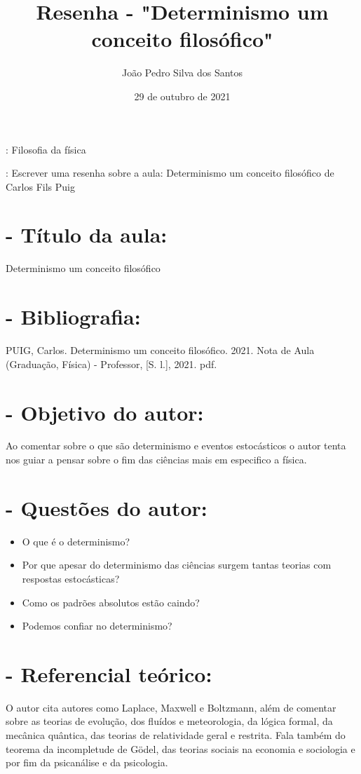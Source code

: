 \documentclass [a4paper, 12pt]{article}
\title{Resenha - "Determinismo um conceito filosófico"}
\author{João Pedro Silva dos Santos}
\date{29 de outubro de 2021}
\begin{document}
\maketitle

{}: Filosofia da física

{}: Escrever uma resenha sobre a aula: Determinismo um conceito filosófico de Carlos Fils Puig

\section*{- Título da aula:}

Determinismo um conceito filosófico

\section*{-  Bibliografia:}

PUIG, Carlos. Determinismo um conceito filosófico. 2021. Nota de Aula (Graduação, Física) - Professor, [S. l.], 2021. pdf.

\section*{- Objetivo do autor:}

Ao comentar sobre o que são determinismo e eventos estocásticos o autor tenta nos guiar a pensar sobre o fim das ciências mais em especifico a física.

\section*{- Questões do autor:}


\begin{itemize}
    \item O que é o determinismo?
    \item Por que apesar do determinismo das ciências surgem tantas teorias com respostas estocásticas?
    \item Como os padrões absolutos estão caindo?
    \item Podemos confiar no determinismo?
\end{itemize}

\section*{- Referencial teórico:}

O autor cita autores como Laplace, Maxwell e Boltzmann, além de comentar sobre as teorias de evolução, dos fluídos e meteorologia, da lógica formal, da mecânica quântica, das teorias de relatividade geral e restrita. Fala também do teorema da incompletude de Gödel, das teorias sociais na economia e sociologia e por fim da psicanálise e da psicologia.
\end{document}
